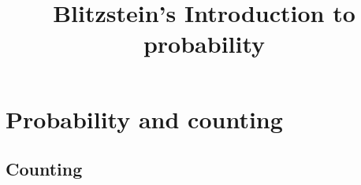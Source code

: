 \documentclass[12pt,oneside,a4paper]{book}
\title{Blitzstein's Introduction to probability}
\author{}
\theoremstyle{plain}
\theoremstyle{definition}
\theoremstyle{remark}
\begin{document}
  \maketitle
  
  \chapter{Probability and counting}
  \section{Counting}
\end{document}
